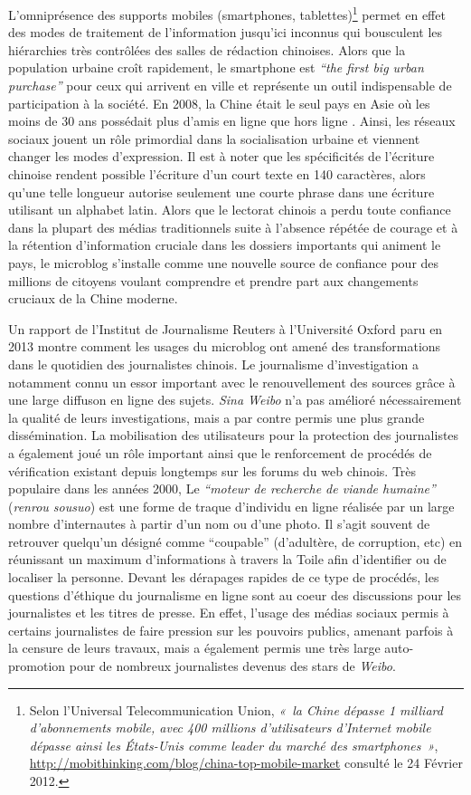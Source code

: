 L’omniprésence des supports mobiles (smartphones, tablettes)\footnote{Selon l’Universal Telecommunication Union, \textit{« la Chine dépasse 1 milliard d’abonnements mobile, avec 400 millions d’utilisateurs d’Internet mobile dépasse ainsi les États-Unis comme leader du marché des smartphones »}, \url{http://mobithinking.com/blog/china-top-mobile-market} consulté le 24 Février 2012.} permet en effet des modes de traitement de l’information jusqu’ici inconnus qui bousculent les hiérarchies très contrôlées des salles de rédaction chinoises. Alors que la population urbaine croît rapidement, le smartphone est \textit{“the first big urban purchase”} \citep{Wallis2013} pour ceux qui arrivent en ville et représente un outil indispensable de participation à la société. En 2008, la Chine était le seul pays en Asie où les moins de 30 ans possédait plus d’amis en ligne que hors ligne \citep{Synovate2009}. Ainsi, les réseaux sociaux jouent un rôle primordial dans la socialisation urbaine et viennent changer les modes d’expression. Il est à noter que les spécificités de l’écriture chinoise rendent possible l’écriture d’un court texte en 140 caractères, alors qu’une telle longueur autorise seulement une courte phrase dans une écriture utilisant un alphabet latin. Alors que le lectorat chinois a perdu toute confiance dans la plupart des médias traditionnels suite à l’absence répétée de courage et à la rétention d’information cruciale dans les dossiers importants qui animent le pays, le microblog s’installe comme une nouvelle source de confiance pour des millions de citoyens voulant comprendre et prendre part aux changements cruciaux de la Chine moderne.

Un rapport de l’Institut de Journalisme Reuters à l’Université Oxford paru en 2013 montre comment les usages du microblog ont amené des transformations dans le quotidien des journalistes chinois. Le journalisme d’investigation a notamment connu un essor important avec le renouvellement des sources grâce à une large diffuson en ligne des sujets. \textit{Sina Weibo} n’a pas amélioré nécessairement la qualité de leurs investigations, mais a par contre permis une plus grande dissémination. La mobilisation des utilisateurs pour la protection des journalistes a également joué un rôle important ainsi que le renforcement de procédés de vérification existant depuis longtemps sur les forums du web chinois. Très populaire dans les années 2000, Le \textit{“moteur de recherche de viande humaine”} (\textit{renrou sousuo}) est une forme de traque d’individu en ligne réalisée par un large nombre d’internautes à partir d’un nom ou d’une photo. Il s’agit souvent de retrouver quelqu’un désigné comme “coupable” (d’adultère, de corruption, etc) en réunissant un maximum d’informations à travers la Toile afin d’identifier ou de localiser la personne. Devant les dérapages rapides de ce type de procédés, les questions d’éthique du journalisme en ligne sont au coeur des discussions pour les journalistes et les titres de presse. En effet, l’usage des médias sociaux permis à certains journalistes de faire pression sur les pouvoirs publics, amenant parfois à la censure de leurs travaux, mais a également permis une très large auto-promotion pour de nombreux journalistes devenus des stars de \textit{Weibo}.

